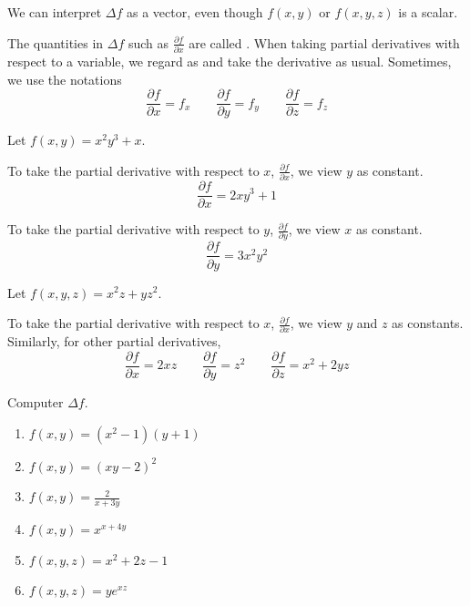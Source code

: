 \documentclass[11pt,fleqn]{book} %
\begin{document}
We can interpret $\Delta f$ as a vector, even though $f(x, y)$ or $f(x, y, z)$ is a scalar.

The quantities in $\Delta f$ such as $\frac{\partial f}{\partial x}$ are called . When taking partial derivatives with respect to a variable, we regard  as  and take the derivative as usual. Sometimes, we use the notations $$\frac{\partial f}{\partial x} = f_x \qquad \frac{\partial f}{\partial y} = f_y \qquad \frac{\partial f}{\partial z} = f_z$$

\begin{example}
    Let $f(x, y) = x^2 y^3 + x$. 

    To take the partial derivative with respect to $x$, $\frac{\partial f}{\partial x}$, we view $y$ as constant. 
    $$\frac{\partial f}{\partial x} = 2xy^3 + 1$$

    To take the partial derivative with respect to $y$, $\frac{\partial f}{\partial y}$, we view $x$ as constant. 
    $$\frac{\partial f}{\partial y} = 3x^2y^2$$
\end{example}

\begin{example}
    Let $f(x, y, z) = x^2z + yz^2$. 

    To take the partial derivative with respect to $x$, $\frac{\partial f}{\partial x}$, we view  $y$ and $z$ as constants. Similarly, for other partial derivatives, 
    $$\frac{\partial f}{\partial x} = 2xz \qquad \frac{\partial f}{\partial y} = z^2 \qquad \frac{\partial f}{\partial z} = x^2 + 2yz$$
\end{example}

\begin{exercise}
    Computer $\Delta f$. 

    \begin{minipage}[t]{0.45\linewidth} 
        \begin{enumerate}
            \item $f(x, y) = (x^2 - 1)(y + 1)$
            \item $f(x, y) = (xy - 2)^2$
            \item $f(x, y) = \frac{2}{x + 3y}$
        \end{enumerate}
    \end{minipage}   
    \begin{minipage}[t]{0.45\linewidth} 
        \begin{enumerate}
            \setcounter{enumi}{3}
            \item $f(x, y) = x^{x + 4y}$
            \item $f(x, y, z) = x^2 + 2z - 1$
            \item $f(x, y, z) = ye^{xz}$
        \end{enumerate}
    \end{minipage}   
\end{exercise}
\end{document}
